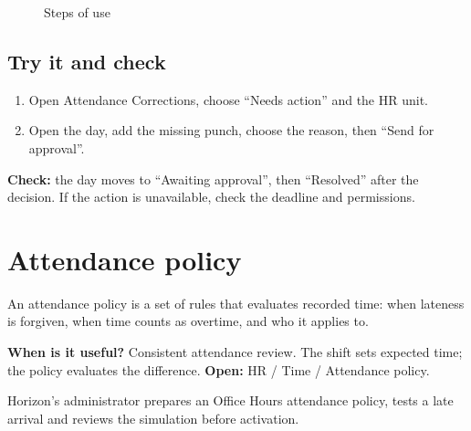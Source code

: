 \begin{figure}[H]
\centering
{}
\rclegend
\caption{Steps of use}
\label{fig:hr-feature-attendance-corrections-flow}
\end{figure}

\subsection{Try it and check}

\begin{enumerate}
  \item Open Attendance Corrections, choose “Needs action” and the HR unit.
  \item Open the day, add the missing punch, choose the reason, then “Send for approval”.
\end{enumerate}

\textbf{Check:} the day moves to “Awaiting approval”, then “Resolved” after the decision. If the action is unavailable, check the deadline and permissions.

\clearpage
\section{Attendance policy}
\label{sec:hr-feature-attendance-policy}

An attendance policy is a set of rules that evaluates recorded time: when lateness is forgiven, when time counts as overtime, and who it applies to.

\textbf{When is it useful?} Consistent attendance review. The shift sets expected time; the policy evaluates the difference. \textbf{Open:} HR / Time / Attendance policy.

\begin{rcnote}
Horizon’s administrator prepares an Office Hours attendance policy, tests a late arrival and reviews the simulation before activation.
\end{rcnote}

